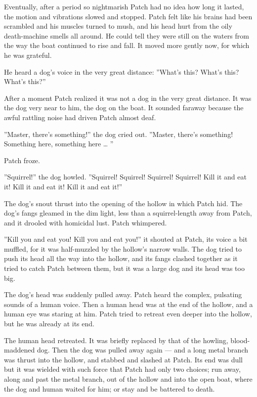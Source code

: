 \documentclass[12pt]{book}
\begin{document}
Eventually, after a period so nightmarish Patch had no idea how long it lasted, the motion and vibrations slowed and stopped. Patch felt like his brains had been scrambled and his muscles turned to mush, and his head hurt from the oily death-machine smells all around. He could tell they were still on the waters from the way the boat continued to rise and fall. It moved more gently now, for which he was grateful.

He heard a dog's voice in the very great distance: ''What's this? What's this? What's this?''

After a moment Patch realized it was not a dog in the very great distance. It was the dog very near to him, the dog on the boat. It sounded faraway because the awful rattling noise had driven Patch almost deaf.

''Master, there's something!'' the dog cried out. ''Master, there's something! Something here, something here \ldots{}
''

Patch froze.

''Squirrel!'' the dog howled. ''Squirrel! Squirrel! Squirrel! Squirrel! Kill it and eat it! Kill it and eat it! Kill it and eat it!''

The dog's snout thrust into the opening of the hollow in which Patch hid. The dog's fangs gleamed in the dim light, less than a squirrel-length away from Patch, and it drooled with homicidal lust. Patch whimpered.

''Kill you and eat you! Kill you and eat you!'' it shouted at Patch, its voice a bit muffled, for it was half-muzzled by the hollow's narrow walls. The dog tried to push its head all the way into the hollow, and its fangs clashed together as it tried to catch Patch between them, but it was a large dog and its head was too big.

The dog's head was suddenly pulled away. Patch heard the complex, pulsating sounds of a human voice. Then a human head was at the end of the hollow, and a human eye was staring at him. Patch tried to retreat even deeper into the hollow, but he was already at its end.

The human head retreated. It was briefly replaced by that of the howling, blood-maddened dog. Then the dog was pulled away again ---
and a long metal branch was thrust into the hollow, and stabbed and slashed at Patch. Its end was dull but it was wielded with such force that Patch had only two choices; run away, along and past the metal branch, out of the hollow and into the open boat, where the dog and human waited for him; or stay and be battered to death.
\end{document}
